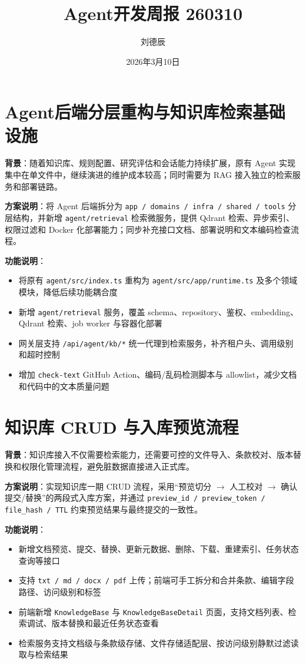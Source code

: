 \documentclass[UTF8]{ctexart}
\title{Agent开发周报 260310}
\author{刘德辰}
\date{2026年3月10日}
\begin{document}
\maketitle

\section{Agent后端分层重构与知识库检索基础设施}

\textbf{背景}：随着知识库、规则配置、研究评估和会话能力持续扩展，原有 Agent 实现集中在单文件中，继续演进的维护成本较高；同时需要为 RAG 接入独立的检索服务和部署链路。

\textbf{方案说明}：将 Agent 后端拆分为 \texttt{app / domains / infra / shared / tools} 分层结构，并新增 \texttt{agent/retrieval} 检索微服务，提供 Qdrant 检索、异步索引、权限过滤和 Docker 化部署能力；同步补充接口文档、部署说明和文本编码检查流程。

\textbf{功能说明}：
\begin{itemize}
\item 将原有 \texttt{agent/src/index.ts} 重构为 \texttt{agent/src/app/runtime.ts} 及多个领域模块，降低后续功能耦合度
\item 新增 \texttt{agent/retrieval} 服务，覆盖 schema、repository、鉴权、embedding、Qdrant 检索、job worker 与容器化部署
\item 网关层支持 \texttt{/api/agent/kb/*} 统一代理到检索服务，补齐租户头、调用级别和超时控制
\item 增加 \texttt{check-text} GitHub Action、编码/乱码检测脚本与 allowlist，减少文档和代码中的文本质量问题
\end{itemize}

\section{知识库 CRUD 与入库预览流程}

\textbf{背景}：知识库接入不仅需要检索能力，还需要可控的文件导入、条款校对、版本替换和权限化管理流程，避免脏数据直接进入正式库。

\textbf{方案说明}：实现知识库一期 CRUD 流程，采用“预览切分 $\rightarrow$ 人工校对 $\rightarrow$ 确认提交/替换”的两段式入库方案，并通过 \texttt{preview\_id / preview\_token / file\_hash / TTL} 约束预览结果与最终提交的一致性。

\textbf{功能说明}：
\begin{itemize}
\item 新增文档预览、提交、替换、更新元数据、删除、下载、重建索引、任务状态查询等接口
\item 支持 \texttt{txt / md / docx / pdf} 上传；前端可手工拆分和合并条款、编辑字段路径、访问级别和标签
\item 前端新增 \texttt{KnowledgeBase} 与 \texttt{KnowledgeBaseDetail} 页面，支持文档列表、检索调试、版本替换和最近任务状态查看
\item 检索服务支持文档级与条款级存储、文件存储适配层、按访问级别静默过滤读取与检索结果
\end{itemize}
\end{document}
